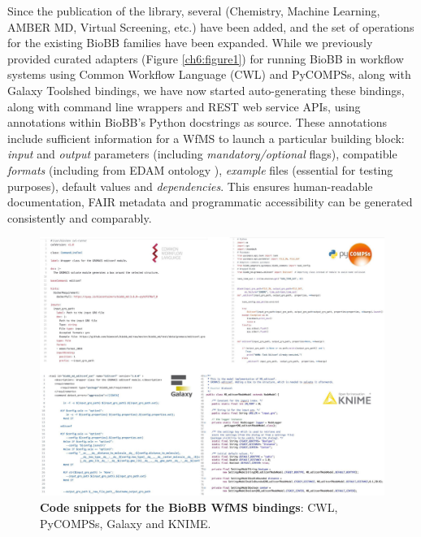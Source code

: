 Since the publication of the library, several
 (Chemistry, Machine Learning, AMBER MD, Virtual
Screening, etc.) have been added, and the set of operations for the
existing BioBB families have been expanded. While we previously provided
curated adapters (Figure \vref{ch6:figure1}) for running BioBB in workflow systems using
Common Workflow Language (CWL) and PyCOMPSs, along with Galaxy Toolshed
bindings, we have now started auto-generating these bindings, along with
command line wrappers and REST web service APIs, using annotations
within BioBB's Python docstrings as source. These annotations include
sufficient information for a WfMS to launch a particular building block:
\emph{input} and \emph{output} parameters (including
\emph{mandatory/optional} flags), compatible \emph{formats} (including
from EDAM ontology \cite{ch6-11}), \emph{example} files (essential for
testing purposes), default values and \emph{dependencies}. This ensures
human-readable documentation, FAIR metadata and programmatic
accessibility can be generated consistently and comparably.

\begin{figure}%
  \includegraphics[width=\textwidth]{figures/ch06/figure1.jpg}
	\caption[Code snippets for the BioBB
  WfMS bindings]{\textbf{Code snippets for the BioBB
  WfMS bindings}: CWL, PyCOMPSs, Galaxy and KNIME.}
  \label{ch6:figure1}
\end{figure}

